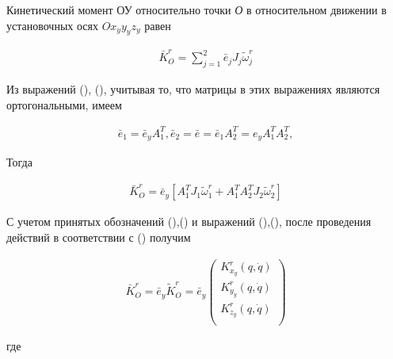 Кинетический момент ОУ относительно точки \textit{О} в относительном движении в установочных осях \( Ox_{y}y_{y}z_{y} \) равен 

\begin{equation}
\label{eq:p3:12}
\begin{alignedat}{2}
\bar{K}_{O}^{r}= \sum_{j=1}^{2}\bar{e}_{j}J_{j} \tilde{\omega}_{j}^{r}
\end{alignedat}
\end{equation}

Из выражений (), (), учитывая то, что матрицы в этих выражениях являются ортогональными, имеем 

\begin{equation}
\label{eq:p3:13}
\begin{alignedat}{2}
\bar{e}_{1} = \bar{e}_{y} A_{1}^{T},
\bar{e}_{2} = 
\bar{e} = 
\bar{e}_{1}A_{2}^{T} = 
e_{y}A_{1}^{T}A_{2}^{T},
\end{alignedat}
\end{equation}

Тогда 

\begin{equation}
\label{eq:p3:14}
\begin{alignedat}{2}
\bar{K}_{O}^{r}=\bar{e}_{y} [ 
	A_{1}^{T}J_{1} \tilde{\omega}_{1}^{r} + A_{1}^{T} A_{2}^{T} J_{2} \tilde{\omega}_{2}^{r} 
] 
\end{alignedat}
\end{equation}

С учетом принятых обозначений (),() и выражений (),(), после проведения действий в соответствии с () получим 

\begin{equation}
\label{eq:p3:15}
\begin{alignedat}{2}
\bar{K}_{O}^{r}=\bar{e}_{y}\tilde{K}_{O}^{r}=\bar{e}_{y} \left( \begin{matrix}
K_{x_{y}}^{r} \left( q,\dot{q} \right) \\
K_{y_{y}}^{r} \left( q,\dot{q} \right) \\
K_{z_{y}}^{r} \left( q,\dot{q} \right) \\
\end{matrix}
\right) 
\end{alignedat}
\end{equation}

где 

